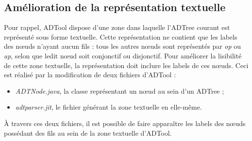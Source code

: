 	\subsection{Amélioration de la représentation textuelle}
		Pour rappel, ADTool dispose d'une zone dans laquelle l'ADTree courant est représenté sous forme textuelle. Cette représentation ne contient que les labels des nœuds n'ayant aucun fils : tous les autres nœuds sont représentés par \emph{op} ou \emph{ap}, selon que ledit nœud soit conjonctif ou disjonctif. Pour améliorer la lisibilité de cette zone textuelle, la représentation doit inclure les labels de ces nœuds. Ceci est réalisé par la modification de deux fichiers d'ADTool :
		\begin{itemize}
		\item \emph{ADTNode.java}, la classe représentant un nœud au sein d'un ADTree ;
		\item \emph{adtparser.jit}, le fichier générant la zone textuelle en elle-même.
		\end{itemize}
		
		À travers ces deux fichiers, il est possible de faire apparaître les labels des nœuds possédant des fils au sein de la zone textuelle d'ADTool.
		
	  